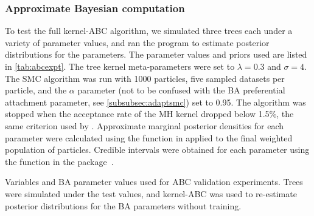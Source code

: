 \subsubsection*{Approximate Bayesian computation}

To test the full kernel-\gls{ABC} algorithm, we simulated three trees each under
a variety of parameter values, and ran the  program to
estimate posterior distributions for the parameters. The parameter values and
priors used are listed in \cref{tab:abcexpt}. The tree kernel meta-parameters
were set to $\lambda = 0.3$ and $\sigma = 4$. The \gls{SMC} algorithm was run
with 1000 particles, five sampled datasets per particle, and the $\alpha$
parameter (not to be confused with the \gls{BA} preferential attachment
parameter, see \cref{subsubsec:adaptsmc}) set to 0.95. The algorithm was
stopped when the acceptance rate of the \gls{MH} kernel dropped below 1.5\%,
the same criterion used by \citeauthor{del2012adaptive}. Approximate marginal
posterior densities for each parameter were calculated using the
 function in  applied to the final weighted
population of particles. Credible intervals were obtained for each parameter
using the  function in the 
package~\autocite{plummer2006coda}.

\begin{table}[ht]
  \centering
  
  \caption[Variables used in grid search experiments]
  {
    Variables and \gls{BA} parameter values used for \gls{ABC} validation
    experiments. Trees were simulated under the test values, and
    kernel-\gls{ABC} was used to re-estimate posterior distributions for the
    \gls{BA} parameters without training.
  }
  \label{tab:abcexpt}
\end{table}

%

